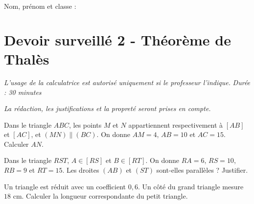 \documentclass[a4paper,10pt]{report}
\begin{document}
\pagestyle{empty}
\noindent Nom, prénom et classe : \dotfill

\section*{Devoir surveillé 2 - Théorème de Thalès}

\noindent \textit{L'usage de la calculatrice est autorisé uniquement si le professeur l'indique.} \hfill \textit{Durée : 30 minutes}

\medskip
\noindent \textit{La rédaction, les justifications et la propreté seront prises en compte.}


\begin{ex}
Dans le triangle $ABC$, les points $M$ et $N$ appartiennent respectivement à $[AB]$ et $[AC]$, et $(MN)\parallel(BC)$. On donne $AM=4$, $AB=10$ et $AC=15$. Calculer $AN$.
\medskip\noindent\grandscarreaux{\linewidth}{4cm}
\end{ex}
\begin{ex}[Réciproque]
Dans le triangle $RST$, $A\in[RS]$ et $B\in[RT]$. On donne $RA=6$, $RS=10$, $RB=9$ et $RT=15$. Les droites $(AB)$ et $(ST)$ sont-elles parallèles ? Justifier.
\medskip\noindent\grandscarreaux{\linewidth}{5cm}
\end{ex}
\begin{ex}[Agrandissement]
Un triangle est réduit avec un coefficient $0,6$. Un côté du grand triangle mesure $18$ cm. Calculer la longueur correspondante du petit triangle.
\medskip\noindent\grandscarreaux{\linewidth}{3cm}
\end{ex}
\end{document}

